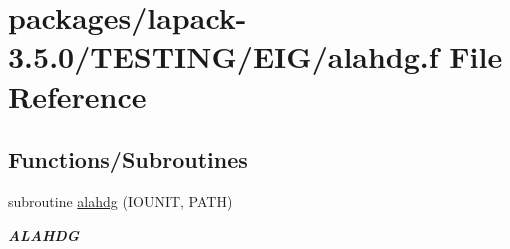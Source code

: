 \hypertarget{alahdg_8f}{}\section{packages/lapack-\/3.5.0/\+T\+E\+S\+T\+I\+N\+G/\+E\+I\+G/alahdg.f File Reference}
\label{alahdg_8f}
\subsection*{Functions/\+Subroutines}
\begin{DoxyCompactItemize}
\item 
subroutine \hyperlink{group__aux__eig_gad1fc479bdf1b02f3844d630fa505e814}{alahdg} (I\+O\+U\+N\+I\+T, P\+A\+T\+H)
\begin{DoxyCompactList}\small\item\em {\bfseries A\+L\+A\+H\+D\+G} \end{DoxyCompactList}\end{DoxyCompactItemize}
